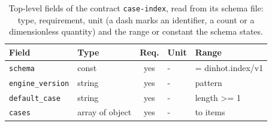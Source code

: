 \begin{table}[t]\centering\footnotesize
\caption{Top-level fields of the contract \texttt{case-index}, read from its schema file: type, requirement, unit (a dash marks an identifier, a count or a dimensionless quantity) and the range or constant the schema states.}\label{tab:contract-case-index}
\begin{tabular}{@{}l l c l >{\raggedright\arraybackslash}p{}@{}}\toprule Field & Type & Req. & Unit & Range\\\midrule
\texttt{\scriptsize schema} & const & yes & - & = dinhot.index/v1\\
\texttt{\scriptsize engine\_version} & string & yes & - & pattern\\
\texttt{\scriptsize default\_case} & string & yes & - & length >= 1\\
\texttt{\scriptsize cases} & array of object & yes & - & 1 to items\\
\bottomrule\end{tabular}\end{table}
